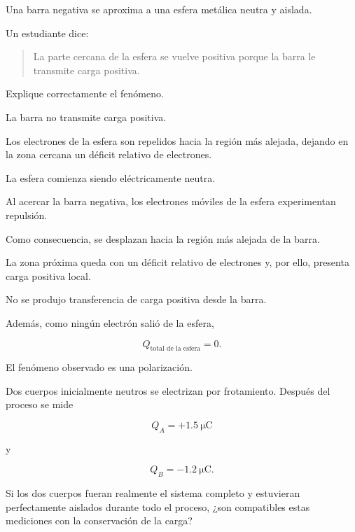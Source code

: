 
\begin{ejercicio}

Una barra negativa se aproxima a una esfera metálica neutra y aislada.

Un estudiante dice:

\begin{quote}
La parte cercana de la esfera se vuelve positiva porque la barra le transmite
carga positiva.
\end{quote}

Explique correctamente el fenómeno.

\end{ejercicio}

\begin{respuesta}

La barra no transmite carga positiva.

Los electrones de la esfera son repelidos hacia la región más alejada,
dejando en la zona cercana un déficit relativo de electrones.

\end{respuesta}

\begin{explicacion}

La esfera comienza siendo eléctricamente neutra.

Al acercar la barra negativa, los electrones móviles de la esfera
experimentan repulsión.

Como consecuencia, se desplazan hacia la región más alejada de la barra.

La zona próxima queda con un déficit relativo de electrones y, por ello,
presenta carga positiva local.

No se produjo transferencia de carga positiva desde la barra.

Además, como ningún electrón salió de la esfera,

\[
Q_{\text{total de la esfera}}=0.
\]

El fenómeno observado es una polarización.

\end{explicacion}



\begin{ejercicio}

Dos cuerpos inicialmente neutros se electrizan por frotamiento. Después del
proceso se mide

\[
Q_A=+\SI{1.5}{\micro\coulomb}
\]

y

\[
Q_B=-\SI{1.2}{\micro\coulomb}.
\]

Si los dos cuerpos fueran realmente el sistema completo y estuvieran
perfectamente aislados durante todo el proceso, ¿son compatibles estas
mediciones con la conservación de la carga?

\end{ejercicio}

